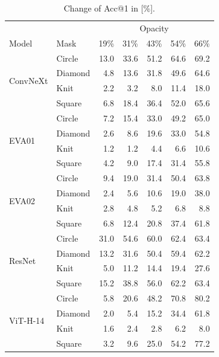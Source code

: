 \documentclass[a4paper, oneside]{discothesis}
\begin{document}
\begin{table}[h]

    \setlength{\tabcolsep}{2pt}

    \centering
    \begin{minipage}{0.48\textwidth}
        \centering

        \begin{tabular}{ll|rrrrr}
			\multicolumn{2}{c|}{} & \multicolumn{5}{c}{Opacity} \\
			Model & Mask &  19\% & 31\% & 43\% & 54\% & 66\% \\
			\midrule
			\multirow{4}{*}{ConvNeXt} & Circle & 13.0  & 33.6  & 51.2  & 64.6  & 69.2  \\
			& Diamond & 4.8  & 13.6  & 31.8  & 49.6  & 64.6  \\
			& Knit & 2.2  & 3.2  & 8.0  & 11.4  & 18.0  \\
			& Square & 6.8  & 18.4  & 36.4  & 52.0  & 65.6 \\\midrule
			\multirow{4}{*}{EVA01} & Circle & 7.2  & 15.4  & 33.0  & 49.2  & 65.0  \\
			& Diamond & 2.6  & 8.6  & 19.6  & 33.0  & 54.8  \\
			& Knit & 1.2  & 1.2  & 4.4  & 6.6  & 10.6  \\
			& Square & 4.2  & 9.0  & 17.4  & 31.4  & 55.8 \\\midrule
			\multirow{4}{*}{EVA02} & Circle & 9.4  & 19.0  & 31.4  & 50.4  & 63.8  \\
			& Diamond & 2.4  & 5.6  & 10.6  & 19.0  & 38.0  \\
			& Knit & 2.8  & 4.8  & 5.2  & 6.8  & 8.8  \\
			& Square & 6.8  & 12.4  & 20.8  & 37.4  & 61.8 \\\midrule
			\multirow{4}{*}{ResNet} & Circle & 31.0  & 54.6  & 60.0  & 62.4  & 63.4  \\
			& Diamond & 13.2  & 31.6  & 50.4  & 59.4  & 62.2  \\
			& Knit & 5.0  & 11.2  & 14.4  & 19.4  & 27.6  \\
			& Square & 15.2  & 38.8  & 56.0  & 62.2  & 63.4 \\\midrule
			\multirow{4}{*}{ViT-H-14} & Circle & 5.8  & 20.6  & 48.2  & 70.8  & 80.2  \\
			& Diamond & 2.0  & 5.4  & 15.2  & 34.4  & 61.8  \\
			& Knit & 1.6 & 2.4  & 2.8  & 6.2  & 8.0  \\
			& Square & 3.2  & 9.6  & 25.0  & 54.2  & 77.2  \\
        \end{tabular}
        \vspace*{0.1cm}
        \caption{Change of Acc@1 in [\%].}
        \label{tab:drop-acc1}
        

\end{minipage}
\end{table}
\end{document}
